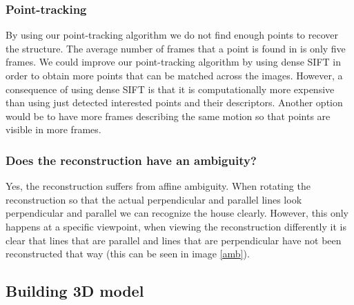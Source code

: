 \documentclass[12pt]{amsart}
\begin{document}
\subsubsection{Point-tracking}
By using our point-tracking algorithm we do not find enough points to recover the structure. The average number of frames that a point is found in is only five frames. We could improve our point-tracking algorithm by using dense SIFT in order to obtain more points that can be matched across the images. However, a consequence of using dense SIFT is that it is computationally more expensive than using just detected interested points and their descriptors. Another option would be to have more frames describing the same motion so that points are visible in more frames.

\subsubsection{Does the reconstruction have an ambiguity?} 
Yes, the reconstruction suffers from affine ambiguity. When rotating the reconstruction so that the actual perpendicular and parallel lines look perpendicular and parallel we can recognize the house clearly. However, this only happens at a specific viewpoint, when viewing the reconstruction differently it is clear that lines that are parallel and lines that are perpendicular have not been reconstructed that way (this can be seen in image \ref{amb}). \subsection{Building 3D model}
\end{document}
